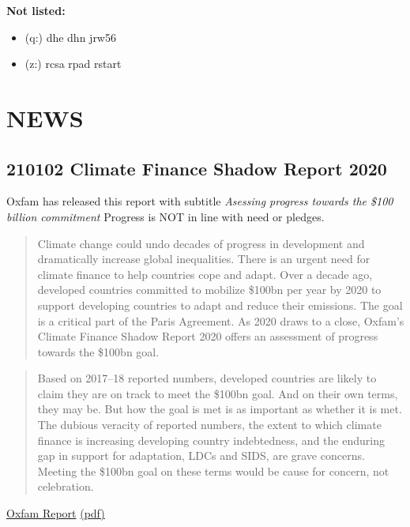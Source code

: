 \documentclass[
]{book}
\providecommand{\tightlist}{%
  \setlength{\itemsep}{0pt}\setlength{\parskip}{0pt}}
\begin{document}
\textbf{Not listed:}

\begin{itemize}
\tightlist
\item
  (q:) dhe dhn jrw56
\item
  (z:) rcsa rpad rstart
\end{itemize}

\hypertarget{news}{%
\chapter{NEWS}\label{news}}

\hypertarget{climate-finance-shadow-report-2020}{%
\section{210102 Climate Finance Shadow Report 2020}\label{climate-finance-shadow-report-2020}}

Oxfam has released this report with subtitle \emph{Asessing progress towards the \$100 billion commitment}
Progress is NOT in line with need or pledges.

\begin{quote}
Climate change could undo decades of progress in development and dramatically increase global inequalities. There is an urgent need for climate finance to help countries cope and adapt.
Over a decade ago, developed countries committed to mobilize \$100bn per year by 2020 to support developing countries to adapt and reduce their emissions. The goal is a critical part of the Paris Agreement.
As 2020 draws to a close, Oxfam's Climate Finance Shadow Report 2020 offers an assessment of progress towards the \$100bn goal.
\end{quote}

\begin{quote}
Based on 2017--18 reported numbers, developed countries are likely to claim they are on track to meet
the \$100bn goal. And on their own terms, they may be. But how the goal is met is as important as whether
it is met. The dubious veracity of reported numbers, the extent to which climate finance is increasing
developing country indebtedness, and the enduring gap in support for adaptation, LDCs and SIDS, are grave
concerns. Meeting the \$100bn goal on these terms would be cause for concern, not celebration.
\end{quote}

\href{https://www.oxfam.org/en/research/climate-finance-shadow-report-2020}{Oxfam Report}
\href{/pdf/Oxfam_2020_Climate_Finance_Shadow_Report.pdf}{(pdf)}

  
\end{document}
